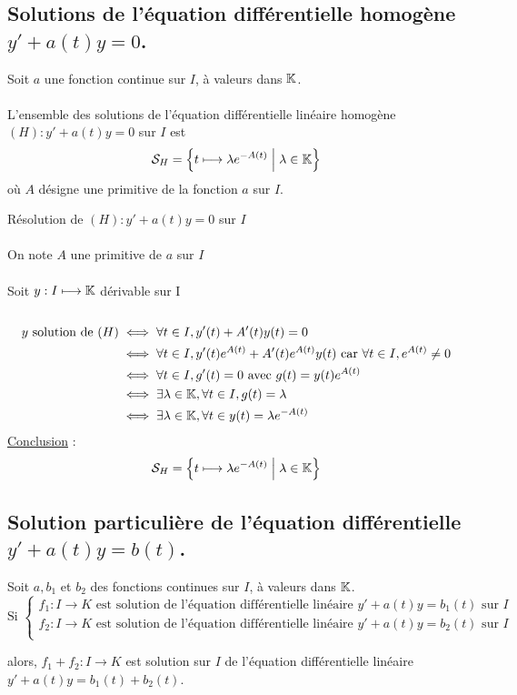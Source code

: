 \subsection{Solutions de l’équation différentielle homogène \(y' + a(t)y = 0\).}
\begin{defprop}
    Soit \(a\) une fonction continue sur \(I\), à valeurs dans \(\mathbb{K}\).\\~\\
    L’ensemble des solutions de l’équation différentielle linéaire homogène \((H) : y' + a(t)y = 0\) sur \(I\) est
    \[\mathcal{S}_H = \left\lbrace t\longmapsto \lambda e^{-A(t)} \;\middle|\; \lambda \in \mathbb{K}\right\rbrace\]
    où \(A\) désigne une primitive de la fonction \(a\) sur \(I\).
\end{defprop}
\begin{dem}
    Résolution de \((H) : y' + a(t)y = 0\) sur \(I\)\\~\\
    On note \(A\) une primitive de \(a\) sur \(I\)\\~\\
    Soit \(y : I \longmapsto \mathbb{K}\) dérivable sur I\\~\\
    \begin{align*}
        y \text{ solution de } (H) & \iff \forall t \in I, y'(t) + A'(t)y(t) =0 \\
        &\iff \forall t \in I, y'(t)e^{A(t)} + A'(t) e^{A(t)} y(t) \text{ car } \forall t \in I,e^{A(t)} \neq 0 \\
        &\iff \forall t \in I, g'(t) = 0 \text{ avec } g(t) = y(t)e^{A(t)}\\
        &\iff \exists \lambda \in \mathbb{K}, \forall t \in I, g(t) = \lambda \\
        &\iff \exists \lambda \in \mathbb{K}, \forall t \in y(t) = \lambda e^{-A(t)}
    \end{align*}
    \underline{Conclusion} : 
    \[\mathcal{S}_H = \left\lbrace t\longmapsto \lambda e^{-A(t)} \;\middle|\; \lambda \in \mathbb{K}\right\rbrace\]
\end{dem}

\subsection{Solution particulière de l’équation différentielle \( y' + a(t)y = b(t)\).}
\begin{defprop}
    Soit \(a, b_1\) et \(b_2\) des fonctions continues sur \(I\), à valeurs dans \(\mathbb{K}\).
    \[\text{Si }\begin{cases}
        f_1 : I \to K \text{ est solution de l’équation différentielle linéaire } y' + a(t)y = b_1(t) \text{ sur } I\\
        f_2 : I \to K \text{ est solution de l’équation différentielle linéaire } y' + a(t)y = b_2(t) \text{ sur } I\\
    \end{cases}\]

    alors, \( f_1 + f_2 : I \to K\) est solution sur \(I\) de l’équation différentielle linéaire \(y' + a(t)y = b_1(t) + b_2(t)\).
\end{defprop}

